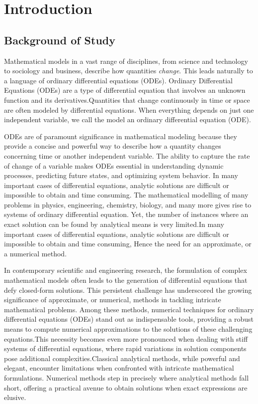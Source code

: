 \setlength{\headheight}{14.49998pt}
\addtolength{\topmargin}{-2.49998pt}

\chapter{Introduction}


\section{Background of Study}
Mathematical models in a vast range of disciplines, from science and technology to sociology and business, describe how quantities \textsl{change}. This leads naturally to a language of ordinary differential equations (ODEs).
Ordinary Differential Equations (ODEs) are a type of differential equation that involves an unknown function and its derivatives.Quantities that change continuously in time or space are often modeled by differential equations. When everything depends on just one independent variable, we call the model an ordinary differential equation (ODE)\cite{fnc_multistep_methods}.

ODEs are of paramount significance in mathematical modeling because they provide a concise and powerful way to describe how a quantity changes concerning time or another independent variable. The ability to capture the rate of change of a variable makes ODEs essential in understanding dynamic processes, predicting future states, and optimizing system behavior.
In many important cases of differential equations, analytic solutions are difficult or impossible to obtain and time
consuming.
The mathematical modelling of many problems in physics, engineering, chemistry, biology, and many more gives rise to systems of ordinary differential equation. Yet, the number of instances where an exact solution can be found by analytical means is very limited\cite{lambert1977}.In many important cases of differential equations, analytic solutions are difficult or impossible to obtain and time
consuming, Hence the need for an approximate, or a numerical method.

In contemporary scientific and engineering research, the formulation of complex mathematical models often leads to the generation of differential equations that defy closed-form solutions. This persistent challenge has underscored the growing significance of approximate, or numerical, methods in tackling intricate mathematical problems. Among these methods, numerical techniques for ordinary differential equations (ODEs) stand out as indispensable tools, providing a robust means to compute numerical approximations to the solutions of these challenging equations.This necessity becomes even more pronounced when dealing with stiff systems of differential equations, where rapid variations in solution components pose additional complexities.Classical analytical methods, while powerful and elegant, encounter limitations when confronted with intricate mathematical formulations. Numerical methods step in precisely where analytical methods fall short, offering a practical avenue to obtain solutions when exact expressions are elusive.

